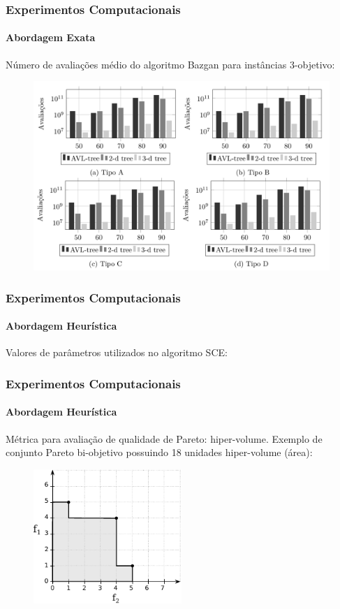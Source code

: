 \documentclass[10pt,xcolor=table,fleqn]{beamer}
\begin{document}
\begin{frame}
  \frametitle{Experimentos Computacionais}
  \framesubtitle{Abordagem Exata}
  Número de avaliações médio do algoritmo Bazgan para instâncias $3$-objetivo:
  \begin{figure}[H]
    \includegraphics[scale=0.3]{../tab/cmp/3dim}
  \end{figure}
\end{frame}

\begin{frame}
  \frametitle{Experimentos Computacionais}
  \framesubtitle{Abordagem Heurística}
  Valores de parâmetros utilizados no algoritmo SCE:
  \begin{table}[H]
    \small
    \centering
    
  \end{table}
\end{frame}

\begin{frame}
  \frametitle{Experimentos Computacionais}
  \framesubtitle{Abordagem Heurística}
  Métrica para avaliação de qualidade de Pareto: hiper-volume.
  \vfill
  Exemplo de conjunto Pareto bi-objetivo possuindo 18 unidades hiper-volume (área):
  \begin{figure}
    \centering
    \includegraphics[width=0.5\textwidth]{../img/sce/hypervol2}
  \end{figure}
\end{frame}
\end{document}
